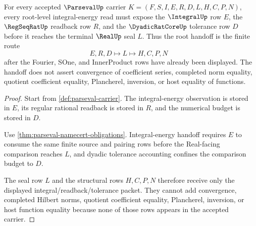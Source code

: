 \begin{theorem}
\label{thm:parseval-root-integral-regseqrat-handoff}
For every accepted $\ParsevalUp$ carrier $K=(F,S,I,E,R,D,L,H,C,P,N)$, every root-level integral-energy read must expose the $\IntegralUp$ row $E$, the $\RegSeqRatUp$ readback row $R$, and the $\DyadicRatCoreUp$ tolerance row $D$ before it reaches the terminal $\RealUp$ seal $L$. Thus the root handoff is the finite route
$$
E,R,D \longmapsto L \longmapsto H,C,P,N
$$
after the Fourier, SOne, and InnerProduct rows have already been displayed. The handoff does not assert convergence of coefficient series, completed norm equality, quotient coefficient equality, Plancherel, inversion, or host equality of functions.
\end{theorem}
\begin{proof}
Start from \autoref{def:parseval-carrier}. The integral-energy observation is stored in $E$, its regular rational readback is stored in $R$, and the numerical budget is stored in $D$.

Use \autoref{thm:parseval-namecert-obligations}. Integral-energy handoff requires $E$ to consume the same finite source and pairing rows before the Real-facing comparison reaches $L$, and dyadic tolerance accounting confines the comparison budget to $D$.

The seal row $L$ and the structural rows $H,C,P,N$ therefore receive only the displayed integral/readback/tolerance packet. They cannot add convergence, completed Hilbert norms, quotient coefficient equality, Plancherel, inversion, or host function equality because none of those rows appears in the accepted carrier.
\end{proof}

